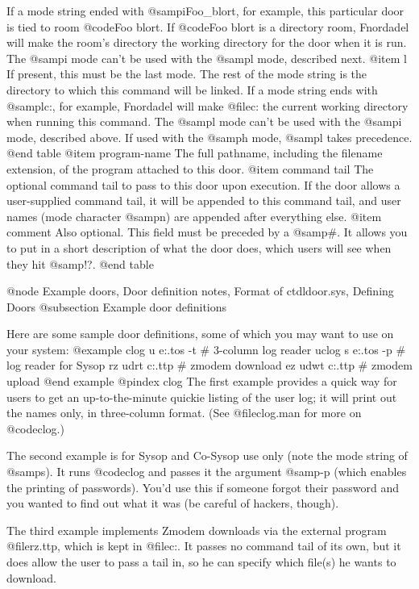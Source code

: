 If a mode string ended with @samp{iFoo_blort}, for example,
this particular door is tied to room @code{Foo blort}.  If @code{Foo blort}
is a directory room, Fnordadel will make the room's directory the working
directory for the door when it is run.  The @samp{i} mode can't be used
with the @samp{l} mode, described next.
@item l
If present, this must be the last mode.  The rest of the mode string is
the directory to which this command will be linked.  If a mode string
ends with @samp{lc:\bin}, for example, Fnordadel will make @file{c:\bin}
the current working directory when running this command.  The @samp{l}
mode can't be used with the @samp{i} mode, described above.  If used with
the @samp{h} mode, @samp{l} takes precedence.
@end table
@item program-name
The full pathname, including the filename
extension, of the program attached to this door.
@item command tail
The optional command tail to pass to this 
door upon execution.  If the door allows a user-supplied 
command tail, it will be appended to this command tail,
and user names (mode character @samp{n}) are appended after
everything else.
@item comment
Also optional.  This field must be preceded by a @samp{#}.  It allows
you to put in a short description of what the door does, which users will
see when they hit @samp{!?}.
@end table

@node Example doors, Door definition notes, Format of ctdldoor.sys, Defining Doors
@subsection Example door definitions

Here are some sample door definitions, some of which you
may want to use on your system:
@example
clog    u       e:\citutil\clog.tos     -t      # 3-column log reader
uclog   s       e:\citutil\clog.tos     -p      # log reader for Sysop
rz      udrt    c:\bin\rz.ttp                   # zmodem download
ez      udwt    c:\bin\sz.ttp                   # zmodem upload
@end example
@pindex clog
The first example provides a quick way for users to get an
up-to-the-minute quickie listing of the user log; it will print
out the names only, in three-column format.  (See @file{clog.man} for
more on @code{clog}.)

The second example is for Sysop and Co-Sysop use only (note the mode string
of @samp{s}).  It runs @code{clog} and passes it the argument @samp{-p} (which
enables the printing of passwords).  You'd use this if someone
forgot their password and you wanted to find out what it was (be
careful of hackers, though).

The third example implements Zmodem downloads via the external
program @file{rz.ttp}, which is kept in @file{c:\bin}.  It passes no command
tail of its own, but it does allow the user to pass a tail in,
so he can specify which file(s) he wants to download.

